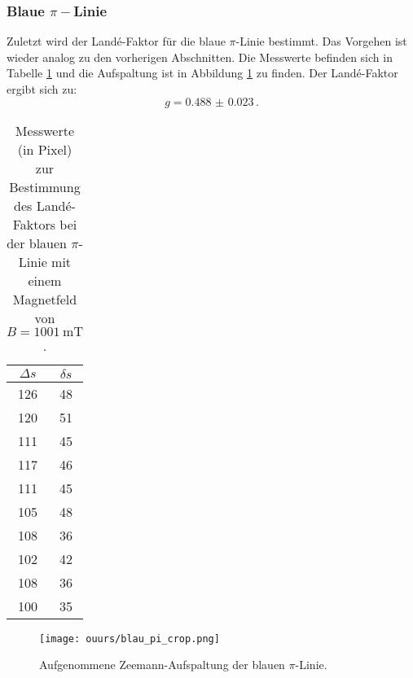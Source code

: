 \subsubsection{Blaue \texorpdfstring{$\pi-$}ALinie}
	Zuletzt wird der Landé-Faktor für die blaue $\pi$-Linie bestimmt. Das Vorgehen ist wieder
	analog zu den vorherigen Abschnitten.
	Die Messwerte befinden sich in Tabelle \ref{tab:blau_pi} und die Aufspaltung
	ist in Abbildung \ref{fig:blau_pi} zu finden.
	Der Landé-Faktor ergibt sich zu:
	\begin{equation*}
		g = \SI{0.488(23)} \, \text{.}
	\end{equation*}
	\begin{table}
		\centering
		\caption{Messwerte (in Pixel) zur Bestimmung des Landé-Faktors bei der blauen $\pi$-Linie mit einem Magnetfeld von $B = \SI{1001}{\milli\tesla}$.}
		\label{tab:blau_pi}
		\begin{tabular}{c | c}
			\toprule
			$\Delta s$ & $\delta s$\\
			\midrule
			126 & 48 \\
			120 & 51 \\
			111 & 45 \\
			117 & 46 \\
			111 & 45 \\
			105 & 48 \\
			108 & 36 \\
			102 & 42 \\
			108 & 36 \\
			100 & 35 \\
			\bottomrule
		\end{tabular}
	\end{table}
	\begin{figure}
	\centering
	\texttt{[image: ouurs/blau\_pi\_crop.png]}
	\caption{Aufgenommene Zeemann-Aufspaltung der blauen $\pi$-Linie.}
	\label{fig:blau_pi}
\end{figure}
